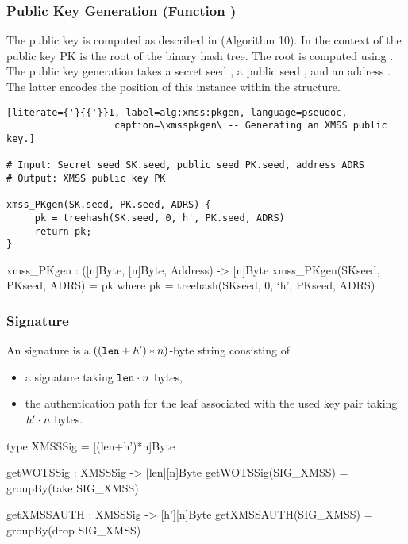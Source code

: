 \subsubsection{\xmss Public Key Generation (Function \xmsspkgen)}
   The \xmss public key is computed as described in \xmsspkgen (Algorithm
   10). In the context of \spx the \xmss public key PK is the root of 
   the binary hash tree. The root is computed using \treehash.  
   The public key generation takes a secret seed \sseed, a public seed \pseed,
   and an address \adrs. The latter encodes the position of this \xmss instance
   within the \spx structure.
   
\begin{lstlisting}[literate={'}{{'}}1, label=alg:xmss:pkgen, language=pseudoc,
                   caption=\xmsspkgen\ -- Generating an XMSS public key.]

# Input: Secret seed SK.seed, public seed PK.seed, address ADRS
# Output: XMSS public key PK

xmss_PKgen(SK.seed, PK.seed, ADRS) {
     pk = treehash(SK.seed, 0, h', PK.seed, ADRS)
     return pk;
}

\end{lstlisting}

\begin{code}
  xmss_PKgen : ([n]Byte, [n]Byte, Address) -> [n]Byte
  xmss_PKgen(SKseed, PKseed, ADRS) = pk where
    pk = treehash(SKseed, 0, `h', PKseed, ADRS)
\end{code}

\subsubsection{\xmss Signature}

   An \xmss signature is a $((\texttt{len} + {h'}) * n)$-byte string consisting
   of
   \begin{itemize}
	\item a \wotsp signature \wotssig taking $\texttt{len} \cdot n$ bytes,
	\item the authentication path \auth for the leaf associated 
	      with the used \wotsp key pair taking ${h'} \cdot n$ bytes.
   \end{itemize}

\begin{code}
  type XMSSSig = [(len+h')*n]Byte

  getWOTSSig : XMSSSig -> [len][n]Byte
  getWOTSSig(SIG_XMSS) = groupBy(take SIG_XMSS)
  
  getXMSSAUTH : XMSSSig -> [h'][n]Byte
  getXMSSAUTH(SIG_XMSS) = groupBy(drop SIG_XMSS)
\end{code}

